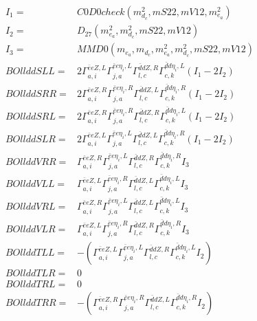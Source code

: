 \documentclass[A4,landscape]{article}
\begin{document}
\begin{align} 
I_1 = & C0D0check(m^2_{d_{{c}}}, mS22, mV12, m^2_{e_{{a}}}) \\ 
I_2 = & D_{27}(m^2_{e_{{a}}}, m^2_{d_{{c}}}, mS22, mV12) \\ 
I_3 = & MMD0(m_{e_{{a}}}, m_{d_{{c}}}, m^2_{e_{{a}}}, m^2_{d_{{c}}}, mS22, mV12) \\ 
  BOllddSLL= & 2  \Gamma^{\bar{e}e Z ,L}_{a, i} \Gamma^{\bar{e}e \eta_i ,L}_{j, a} \Gamma^{\bar{d}d Z ,R}_{l, c} \Gamma^{\bar{d}d \eta_i ,L}_{c, k} (I_1 - 2 I_2) \\ 
  BOllddSRR= & 2  \Gamma^{\bar{e}e Z ,R}_{a, i} \Gamma^{\bar{e}e \eta_i ,R}_{j, a} \Gamma^{\bar{d}d Z ,L}_{l, c} \Gamma^{\bar{d}d \eta_i ,R}_{c, k} (I_1 - 2 I_2) \\ 
  BOllddSRL= & 2  \Gamma^{\bar{e}e Z ,R}_{a, i} \Gamma^{\bar{e}e \eta_i ,R}_{j, a} \Gamma^{\bar{d}d Z ,R}_{l, c} \Gamma^{\bar{d}d \eta_i ,L}_{c, k} (I_1 - 2 I_2) \\ 
  BOllddSLR= & 2  \Gamma^{\bar{e}e Z ,L}_{a, i} \Gamma^{\bar{e}e \eta_i ,L}_{j, a} \Gamma^{\bar{d}d Z ,L}_{l, c} \Gamma^{\bar{d}d \eta_i ,R}_{c, k} (I_1 - 2 I_2) \\ 
  BOllddVRR= &  \Gamma^{\bar{e}e Z ,R}_{a, i} \Gamma^{\bar{e}e \eta_i ,L}_{j, a} \Gamma^{\bar{d}d Z ,R}_{l, c} \Gamma^{\bar{d}d \eta_i ,R}_{c, k} I_3 \\ 
  BOllddVLL= &  \Gamma^{\bar{e}e Z ,L}_{a, i} \Gamma^{\bar{e}e \eta_i ,R}_{j, a} \Gamma^{\bar{d}d Z ,L}_{l, c} \Gamma^{\bar{d}d \eta_i ,L}_{c, k} I_3 \\ 
  BOllddVRL= &  \Gamma^{\bar{e}e Z ,R}_{a, i} \Gamma^{\bar{e}e \eta_i ,L}_{j, a} \Gamma^{\bar{d}d Z ,L}_{l, c} \Gamma^{\bar{d}d \eta_i ,L}_{c, k} I_3 \\ 
  BOllddVLR= &  \Gamma^{\bar{e}e Z ,L}_{a, i} \Gamma^{\bar{e}e \eta_i ,R}_{j, a} \Gamma^{\bar{d}d Z ,R}_{l, c} \Gamma^{\bar{d}d \eta_i ,R}_{c, k} I_3 \\ 
  BOllddTLL= & -( \Gamma^{\bar{e}e Z ,L}_{a, i} \Gamma^{\bar{e}e \eta_i ,L}_{j, a} \Gamma^{\bar{d}d Z ,R}_{l, c} \Gamma^{\bar{d}d \eta_i ,L}_{c, k} I_2) \\ 
  BOllddTLR= & 0 \\ 
  BOllddTRL= & 0 \\ 
  BOllddTRR= & -( \Gamma^{\bar{e}e Z ,R}_{a, i} \Gamma^{\bar{e}e \eta_i ,R}_{j, a} \Gamma^{\bar{d}d Z ,L}_{l, c} \Gamma^{\bar{d}d \eta_i ,R}_{c, k} I_2) \\ 
\end{align} 
\end{document}
